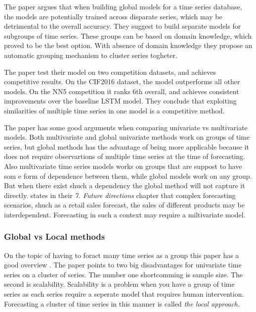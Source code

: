 The paper argues that when building global models for a time series database, the models are
potentially trained across disparate series, which may be detrimental to the overall accuracy.
They suggest to build separate models for subgroups of time series.
These groups can be based on domain knowledge, which proved to be the best option. With absence of 
domain knowledge they propose an automatic grouping mechanism to cluster series togheter.

The paper test their model on two competition datasets, and achieves competitive results.
On the CIF2016 dataset, the model outperforms all other models.
On the NN5 competition it ranks 6th overall, and achieves consistent improvements over the baseline LSTM model.
They conclude that exploiting similarities of multiple time series in one model
is a competitive method.

The paper \cite{Rabanser2020} has some good arguments when comparing univariate vs multivariate models.
Both multivariate and global univariate methods work on groups of time series, but global methods
has the advantage of being more applicable because it does not require observartions of multiple
time series at the time of forecasting.
Also multivariate time series models works on groups that are suppost to have som e form of 
dependence between them, while global models work on any group.
But when there exist shuch a dependency the global method will not capture it directly.
\cite{Hewamalage2021} states in their \textit{7. Future directions} chapter that complex
forecasting scenarios, shuch as a retail sales forecast, the sales of different products
may be interdependent.
Forecasting in such a context may require a miltivariate model.


\subsubsection{Global vs Local methods}
On the topic of having to foract many time series as a group this paper has a good overview 
\cite{Montero-Manso2021}.
The paper points to two big disadvantages for univariate time series on a cluster of series.
The number one shortcomming is sample size. The second is scalability.
Scalability is a problem when you have a group of time series as each series require a seperate model
that requires human intervention. Forecasting a cluster of time series in this manner is called
\textit{the local approach.}

